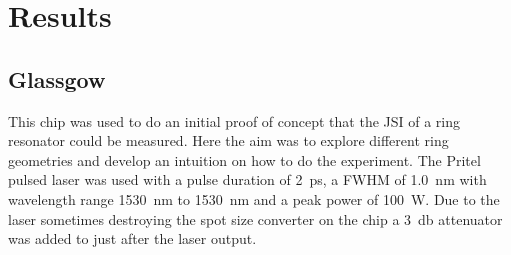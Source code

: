 \newpage
\section{Results}
\subsection{Glassgow}



This chip was used to do an initial proof of concept that the JSI of a ring resonator could be measured. Here the aim was to explore different ring geometries and develop an intuition on how to do the experiment. The Pritel pulsed laser was used with a pulse duration of \SI{2}{\pico\second}, a FWHM of \SI{1.0}{\nano\meter} with wavelength range \SI{1530}{\nano\meter} to \SI{1530}{\nano\meter} and a peak power of \SI{100}{\watt}. Due to the laser sometimes destroying the spot size converter on the chip a \SI{3}{\decibel} attenuator was added to just after the laser output.


